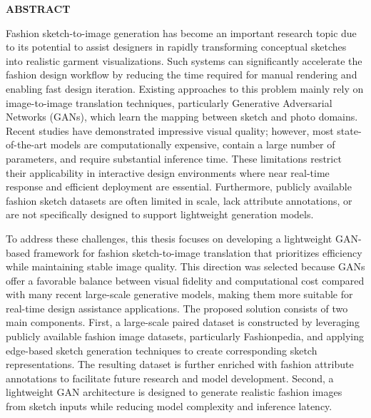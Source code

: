\documentclass[../main.tex]{subfiles}
\begin{document}
\begin{center}
    \Large{\textbf{ABSTRACT}}\\
\end{center}
\vspace{1cm}
Fashion sketch-to-image generation has become an important research topic due to its potential to assist designers in rapidly transforming conceptual sketches into realistic garment visualizations. Such systems can significantly accelerate the fashion design workflow by reducing the time required for manual rendering and enabling fast design iteration. Existing approaches to this problem mainly rely on image-to-image translation techniques, particularly Generative Adversarial Networks (GANs), which learn the mapping between sketch and photo domains. Recent studies have demonstrated impressive visual quality; however, most state-of-the-art models are computationally expensive, contain a large number of parameters, and require substantial inference time. These limitations restrict their applicability in interactive design environments where near real-time response and efficient deployment are essential. Furthermore, publicly available fashion sketch datasets are often limited in scale, lack attribute annotations, or are not specifically designed to support lightweight generation models.

To address these challenges, this thesis focuses on developing a lightweight GAN-based framework for fashion sketch-to-image translation that prioritizes efficiency while maintaining stable image quality. This direction was selected because GANs offer a favorable balance between visual fidelity and computational cost compared with many recent large-scale generative models, making them more suitable for real-time design assistance applications. The proposed solution consists of two main components. First, a large-scale paired dataset is constructed by leveraging publicly available fashion image datasets, particularly Fashionpedia, and applying edge-based sketch generation techniques to create corresponding sketch representations. The resulting dataset is further enriched with fashion attribute annotations to facilitate future research and model development. Second, a lightweight GAN architecture is designed to generate realistic fashion images from sketch inputs while reducing model complexity and inference latency.
\end{document}
